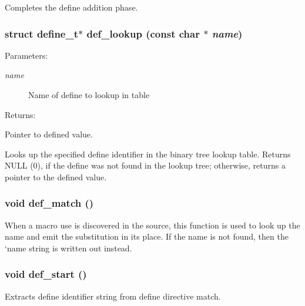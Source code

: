 Completes the define addition phase. 
\subsubsection{\setlength{\rightskip}{0pt plus 5cm}struct define\_\-t$\ast$ def\_\-lookup (const char $\ast$ {\em name})\hspace{0.3cm}{\tt  [static]}}\label{lexer_8c_a152}


\begin{Desc}
\item[Parameters: ]\par
\begin{description}
\item[{\em 
name}]Name of define to lookup in table \end{description}
\end{Desc}
\begin{Desc}
\item[Returns: ]\par
Pointer to defined value.\end{Desc}
Looks up the specified define identifier in the binary tree lookup table. Returns NULL (0), if the define was not found in the lookup tree; otherwise, returns a pointer to the defined value. 
\subsubsection{\setlength{\rightskip}{0pt plus 5cm}void def\_\-match ()\hspace{0.3cm}{\tt  [static]}}\label{lexer_8c_a141}


When a macro use is discovered in the source, this function is used to look up the name and emit the substitution in its place. If the name is not found, then the `name string is written out instead. 
\subsubsection{\setlength{\rightskip}{0pt plus 5cm}void def\_\-start ()\hspace{0.3cm}{\tt  [static]}}\label{lexer_8c_a142}


Extracts define identifier string from define directive match. 

